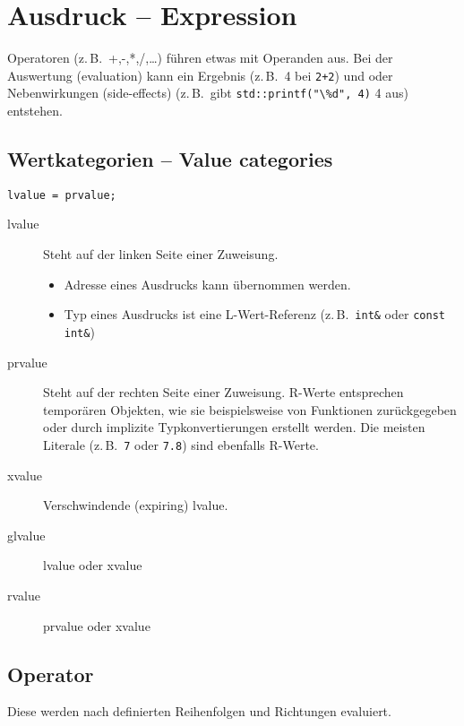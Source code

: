 \section{Ausdruck -- Expression}

Operatoren (z.\,B.\ +,-,*,/,\dots) führen etwas mit Operanden aus. Bei der
Auswertung (evaluation) kann ein Ergebnis (z.\,B.\ 4 bei \lstinline|2+2|) und
oder Nebenwirkungen (side-effects) (z.\,B.\ gibt
\lstinline|std::printf("\%d", 4)| 4 aus) entstehen.

\subsection{Wertkategorien -- Value categories}

\lstinline|lvalue = prvalue;|

\begin{description}
  \item[lvalue] Steht auf der linken Seite einer Zuweisung.
  \begin{itemize}
    \item Adresse eines Ausdrucks kann übernommen werden.
    \item Typ eines Ausdrucks ist eine L-Wert-Referenz (z.\,B.\ \lstinline|int&|
    oder \lstinline|const int&|)
  \end{itemize}
  \item[prvalue] Steht auf der rechten Seite einer Zuweisung. R-Werte
  entsprechen temporären Objekten, wie sie beispielsweise von Funktionen
  zurückgegeben oder durch implizite Typkonvertierungen erstellt werden. Die
  meisten Literale (z.\,B.\ \lstinline|7| oder \lstinline|7.8|) sind ebenfalls
  R-Werte.
  \item[xvalue] Verschwindende (expiring) lvalue.
  \item[glvalue] lvalue oder xvalue
  \item[rvalue] prvalue oder xvalue
\end{description}

\subsection{Operator}

Diese werden nach definierten Reihenfolgen und Richtungen evaluiert.

